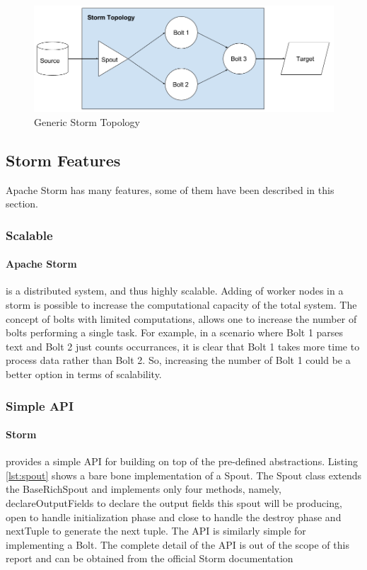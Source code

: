 \documentclass[runningheads,a4paper]{llncs}[2015/06/24]
\begin{document}
\begin{figure}
  \begin{center}
    \includegraphics[width=\textwidth]{topo.png}
    \caption{Generic Storm Topology}
    \label{fig:communication}
   \end{center}
\end{figure}

\subsection{Storm Features}
Apache Storm has many features, some of them have been described in this section.
\subsubsection{Scalable}
\paragraph{Apache Storm} is a distributed system, and thus highly scalable. Adding of worker nodes in a storm is possible to increase the computational capacity of the total system. The concept of bolts with limited computations, allows one to increase the number of bolts performing a single task. For example, in a scenario where Bolt 1 parses text and Bolt 2 just counts occurrances, it is clear that Bolt 1 takes more time to process data rather than Bolt 2. So, increasing the number of Bolt 1 could be a better option in terms of scalability.

\subsubsection{Simple API}
\paragraph{Storm} provides a simple API for building on top of the pre-defined abstractions. Listing \ref{lst:spout} shows a bare bone implementation of a Spout. The Spout class extends the BaseRichSpout and implements only four methods, namely, declareOutputFields to declare the output fields this spout will be producing, open to handle initialization phase and close to handle the destroy phase and nextTuple to generate the next tuple. The API is similarly simple for implementing a Bolt. The complete detail of the API is out of the scope of this report and can be obtained from the official Storm documentation
\end{document}
